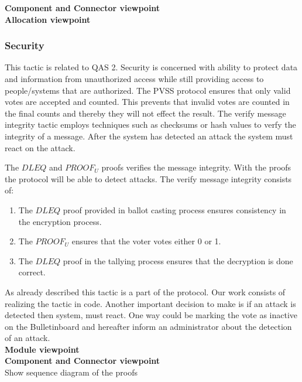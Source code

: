 \noindent
\textbf{Component and Connector viewpoint}\\

\noindent
\textbf{Allocation viewpoint}\\


\noindent
\subsubsection{Security}
This tactic is related to QAS 2. Security is concerned with ability to protect data and information from unauthorized access while still providing access to people/systems that are authorized. The PVSS protocol ensures that only valid votes are accepted and counted. This prevents that invalid votes are counted in the final counts and thereby they will not effect the result. The verify message integrity tactic employs techniques such as checksums or hash values to verfy the integrity of a message. After the system has detected an attack the system must react on the attack.

\begin{center}
\end{center}
The $DLEQ$ and $PROOF_U$ proofs verifies the message integrity. With the proofs the protocol will be able to detect attacks. The verify message integrity consists of:

\begin{enumerate}
    \item The $DLEQ$ proof provided in ballot casting process ensures consistency in the encryption process.
    \item  The $PROOF_U$ ensures that the voter votes either 0 or 1.
    \item  The $DLEQ$ proof in the tallying process ensures that the decryption is done correct.
\end{enumerate}

\noindent
As already described this tactic is a part of the protocol. Our work consists of realizing the tactic in code. Another important decision to make is if an attack is detected then system, must react. One way could be marking the vote as inactive on the Bulletinboard and hereafter inform an administrator about the detection of an attack.\\   

\noindent
\textbf{Module viewpoint}\\


\noindent
\textbf{Component and Connector viewpoint}\\
Show sequence diagram of the proofs\\

